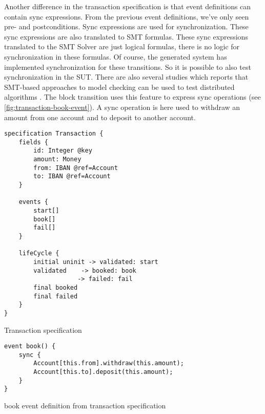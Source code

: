 Another difference in the transaction specification is that event definitions
can contain sync expressions. From the previous event definitions, we've only
seen pre- and postconditions. Sync expressions are used for synchronization.
These sync expressions are also translated to SMT formulas. These sync
expressions translated to the SMT Solver are just logical formulas, there is no
logic for synchronization in these formulas. Of course, the generated system has
implemented synchronization for these transitions. So it is possible to also
test synchronization in the SUT. There are also several studies which reports
that SMT-based approaches to model checking can be used to test distributed
algorithms \cite{konnov2015you,alberti2015smt}.
The block transition uses this feature to express sync operations (see
\autoref{fig:transaction-book-event}). A sync operation is here used to withdraw
an amount from one account and to deposit to another account.


\begin{sourcecode}[h!]
\begin{lstlisting}[]
specification Transaction {
	fields {
		id: Integer @key
		amount: Money
		from: IBAN @ref=Account
		to: IBAN @ref=Account
	}

	events {
		start[]
		book[]
		fail[]
	}

	lifeCycle {
		initial uninit -> validated: start
		validated    -> booked: book
					-> failed: fail
		final booked
		final failed
	}
}
\end{lstlisting}
\caption{Transaction specification}
\label{fig:transaction-spec}
\end{sourcecode}

\begin{sourcecode}[h!]
\begin{lstlisting}[]
event book() {
	sync {
		Account[this.from].withdraw(this.amount);
		Account[this.to].deposit(this.amount);
	}
}
\end{lstlisting}
\caption{book event definition from transaction specification}
\label{fig:transaction-book-event}
\end{sourcecode}

